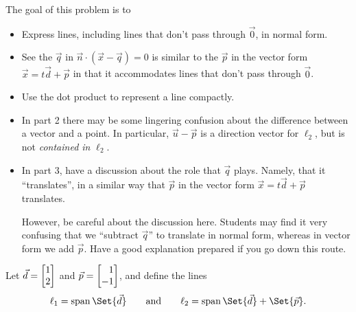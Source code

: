 	\question
	\begin{annotation}
		\begin{goals}

			The goal of this problem is to
			\begin{itemize}
				\item Express lines, including lines that don't pass through $\vec 0$,
					in normal form.
				\item See the $\vec q$ in $\vec n\cdot (\vec x-\vec q)=0$ is similar
					to the $\vec p$ in the vector form $\vec x=t\vec d+\vec p$ in
					that it accommodates lines that don't pass through $\vec 0$.
				\item Use the dot product to represent a line compactly.
			\end{itemize}
		\end{goals}

		\begin{notes}
			\begin{itemize}
				\item In part 2 there may be some lingering confusion about the difference between
					a vector and a point. In particular, $\vec u-\vec p$ is a direction vector for $\ell_2$,
					but is not \emph{contained in} $\ell_2$.
				\item In part 3, have a discussion about the role that $\vec q$ plays. Namely,
					that it ``translates'', in a similar way that $\vec p$ in the vector
					form $\vec x=t\vec d+\vec p$ translates.

					However, be careful about the discussion here. Students may find it very
					confusing that we ``subtract $\vec q$'' to translate in normal form, whereas in
					vector form we add $\vec p$. Have a good explanation prepared if you go
					down this route.
			\end{itemize}
		\end{notes}
	\end{annotation}
	Let $\vec d=\mat{1\\2}$ and $\vec p=\mat{1\\-1}$, and define the lines
	\[
		\ell_1 = \Span\Set{\vec d}\qquad\text{and}\qquad \ell_2=\Span\Set{\vec d}+\Set{\vec p}.
	\]
